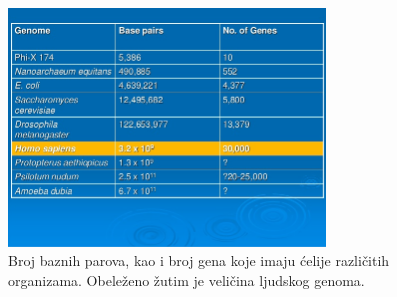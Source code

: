 \documentclass[a4paper]{article}
\begin{document}
{\begin{figure}[h!]
\begin{center}
\end{center}
\centering
\includegraphics[width=0.75\textwidth]{velicina_genoma}
\caption{Broj baznih parova, kao i broj gena koje imaju ćelije različitih organizama. Obeleženo žutim je veličina ljudskog genoma.}
\label{fig:velicinagenoma}
\end{figure}

}
\end{document}
